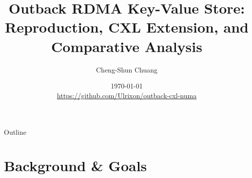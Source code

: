 \documentclass[aspectratio=169]{beamer}
\title[Outback: RDMA Reproduction \& CXL Extension]{%
  Outback RDMA Key-Value Store:\\
  Reproduction, CXL Extension, and Comparative Analysis}
\author{Cheng-Shun Chuang}
\date{\today\\[4pt]
  \footnotesize\url{https://github.com/Ulrixon/outback-cxl-numa}}
\begin{document}
\begin{frame}
\titlepage
\end{frame}

\begin{frame}{Outline}
\tableofcontents[hideallsubsections]
\end{frame}

\section{Background \& Goals}
\end{document}
